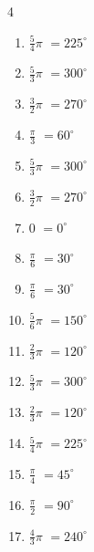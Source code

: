 \begin{multicols}{4}
\begin{enumerate}
  \item $\displaystyle \frac{5}{4}\pi$
        $\displaystyle =225^{\circ}$

\columnbreak %

  \item $\displaystyle \frac{5}{3}\pi$
        $\displaystyle =300^{\circ}$

  \item $\displaystyle \frac{3}{2}\pi$
        $\displaystyle =270^{\circ}$

  \item $\displaystyle \frac{\pi}{3}$
        $\displaystyle =60^{\circ}$

  \item $\displaystyle \frac{5}{3}\pi$
        $\displaystyle =300^{\circ}$

  \item $\displaystyle \frac{3}{2}\pi$
        $\displaystyle =270^{\circ}$

  \item $\displaystyle 0$
        $\displaystyle =0^{\circ}$

  \item $\displaystyle \frac{\pi}{6}$
        $\displaystyle =30^{\circ}$

  \item $\displaystyle \frac{\pi}{6}$
        $\displaystyle =30^{\circ}$

  \item $\displaystyle \frac{5}{6}\pi$
        $\displaystyle =150^{\circ}$

  \item $\displaystyle \frac{2}{3}\pi$
        $\displaystyle =120^{\circ}$

  \item $\displaystyle \frac{5}{3}\pi$
        $\displaystyle =300^{\circ}$

  \item $\displaystyle \frac{2}{3}\pi$
        $\displaystyle =120^{\circ}$

  \item $\displaystyle \frac{5}{4}\pi$
        $\displaystyle =225^{\circ}$

  \item $\displaystyle \frac{\pi}{4}$
        $\displaystyle =45^{\circ}$

  \item $\displaystyle \frac{\pi}{2}$
        $\displaystyle =90^{\circ}$

  \item $\displaystyle \frac{4}{3}\pi$
        $\displaystyle =240^{\circ}$


\end{enumerate}
\end{multicols}
